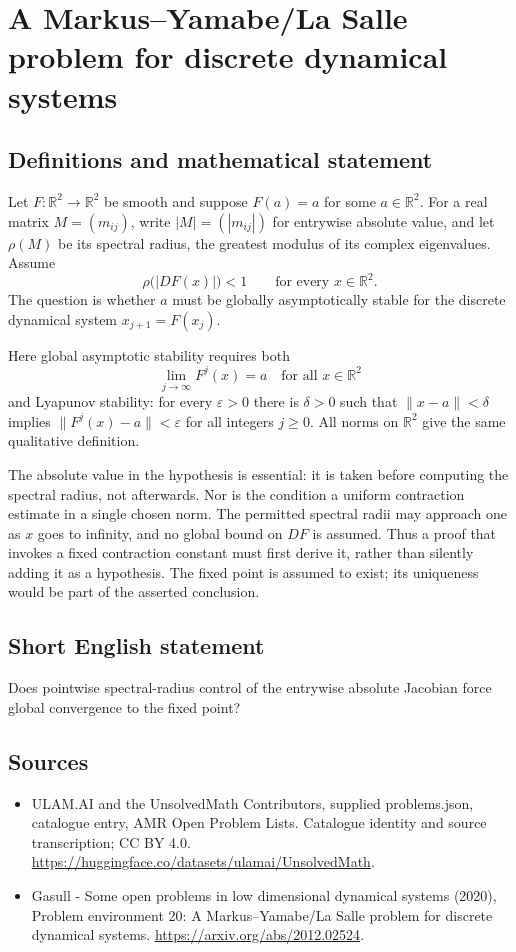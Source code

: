 \documentclass[11pt,a4paper]{article}
\begin{document}
\section*{A Markus–Yamabe/La Salle problem for discrete dynamical systems}\label{statement}

\subsection{Definitions and mathematical statement}
Let $F:\mathbb R^2\to\mathbb R^2$ be smooth and suppose $F(a)=a$ for some
$a\in\mathbb R^2$. For a real matrix $M=(m_{ij})$, write $|M|=(|m_{ij}|)$
for entrywise absolute value, and let $\rho(M)$ be its spectral radius,
the greatest modulus of its complex eigenvalues. Assume
\[
 \rho\bigl(|DF(x)|\bigr)<1\qquad\text{for every }x\in\mathbb R^2.
\]
The question is whether $a$ must be globally asymptotically stable for the
discrete dynamical system $x_{j+1}=F(x_j)$.

Here global asymptotic stability requires both
\[
 \lim_{j\to\infty}F^j(x)=a\quad\text{for all }x\in\mathbb R^2
\]
and Lyapunov stability: for every $\varepsilon>0$ there is $\delta>0$ such
that $\|x-a\|<\delta$ implies $\|F^j(x)-a\|<\varepsilon$ for all
integers $j\ge0$. All norms on $\mathbb R^2$ give the same qualitative
definition.

The absolute value in the hypothesis is essential: it is taken before
computing the spectral radius, not afterwards. Nor is the condition a
uniform contraction estimate in a single chosen norm. The permitted
spectral radii may approach one as $x$ goes to infinity, and no global
bound on $DF$ is assumed. Thus a proof that invokes a fixed contraction
constant must first derive it, rather than silently adding it as a
hypothesis. The fixed point is assumed to exist; its uniqueness would be
part of the asserted conclusion.
\subsection{Short English statement}
Does pointwise spectral-radius control of the entrywise absolute Jacobian force global convergence to the fixed point?
\subsection{Sources}
\begin{itemize}
\item[S1] ULAM.AI and the UnsolvedMath Contributors, supplied problems.json, catalogue entry, AMR Open Problem Lists. Catalogue identity and source transcription; CC BY 4.0.
\url{https://huggingface.co/datasets/ulamai/UnsolvedMath}.
\item[S2] Gasull - Some open problems in low dimensional dynamical systems (2020), Problem environment 20: A Markus–Yamabe/La Salle problem for discrete dynamical systems. 
\url{https://arxiv.org/abs/2012.02524}.
\end{itemize}
\end{document}

